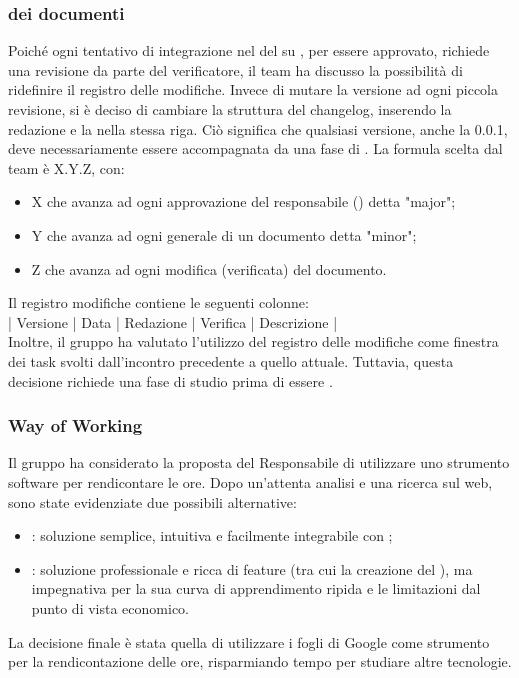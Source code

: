\subsubsection{ dei documenti} \label{sec:versionamento}
Poiché ogni tentativo di integrazione nel  del  su , per essere approvato, richiede una revisione da parte del verificatore, il team ha discusso la possibilità di ridefinire il registro delle modifiche. Invece di mutare la versione ad ogni piccola revisione, si è deciso di cambiare la struttura del changelog, inserendo la redazione e la  nella stessa riga. Ciò significa che qualsiasi versione, anche la 0.0.1, deve necessariamente essere accompagnata da una fase di . La formula scelta dal team è X.Y.Z, con:
\begin{itemize}
	\item X che avanza ad ogni approvazione del responsabile () detta "major";
	\item Y che avanza ad ogni  generale di un documento detta "minor";
	\item Z che avanza ad ogni modifica (verificata) del documento.
\end{itemize}

\vspace{0.5\baselineskip}
Il registro modifiche contiene le seguenti colonne: \\
\vspace{\baselineskip}
\hspace{1cm} | Versione | Data | Redazione | Verifica | Descrizione | \\
Inoltre, il gruppo ha valutato l'utilizzo del registro delle modifiche come finestra dei task svolti dall'incontro precedente a quello attuale. Tuttavia, questa decisione richiede una fase di studio prima di essere .

\subsubsection{Way of Working}
Il gruppo ha considerato la proposta del Responsabile di utilizzare uno strumento software per rendicontare le ore. Dopo un'attenta analisi e una ricerca sul web, sono state evidenziate due possibili alternative:
\begin{itemize}
	\item {}: soluzione semplice, intuitiva e facilmente integrabile con ;
	\item {}: soluzione professionale e ricca di feature (tra cui la creazione del ), ma impegnativa per la sua curva di apprendimento ripida e le limitazioni dal punto di vista economico.
\end{itemize}
La decisione finale è stata quella di utilizzare i fogli di Google come strumento per la rendicontazione delle ore, risparmiando tempo per studiare altre tecnologie. 

